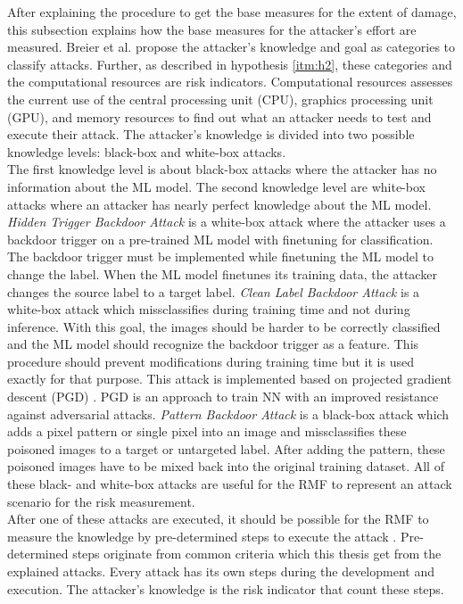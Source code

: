 After explaining the procedure to get the base measures for the extent of damage, this subsection explains how the base measures for the attacker's effort are measured. Breier et al. \cite{DBLP:journals/corr/abs-2012-04884} propose the attacker's knowledge and goal as categories to classify attacks. Further, as described in hypothesis \ref{itm:h2}, these categories and the computational resources are risk indicators. Computational resources assesses the current use of the central processing unit (CPU), graphics processing unit (GPU), and memory resources to find out what an attacker needs to test and execute their attack. The attacker's knowledge is divided into two possible knowledge levels: black-box and white-box attacks. \\
The first knowledge level is about black-box attacks where the attacker has no information about the ML model.
The second knowledge level are white-box attacks where an attacker has nearly perfect knowledge about the ML model.
\textit{Hidden Trigger Backdoor Attack} \cite{DBLP:journals/corr/abs-1910-00033} is a white-box attack where the attacker uses a backdoor trigger on a pre-trained ML model with finetuning for classification. The backdoor trigger must be implemented while finetuning the ML model to change the label. When the ML model finetunes its training data, the attacker changes the source label to a target label. \textit{Clean Label Backdoor Attack} \cite{turner2018clean} is a white-box attack which missclassifies during training time and not during inference. With this goal, the images should be harder to be correctly classified and the ML model should recognize the backdoor trigger as a feature. This procedure should prevent modifications during training time but it is used exactly for that purpose. This attack is implemented based on projected gradient descent (PGD) \cite{DBLP:journals/corr/MadryMSTV17}. PGD is an approach to train NN with an improved resistance against adversarial attacks.
\textit{Pattern Backdoor Attack} \cite{DBLP:journals/corr/abs-1708-06733} is a black-box attack which adds a pixel pattern or single pixel into an image and missclassifies these poisoned images to a target or untargeted label. After adding the pattern, these poisoned images have to be mixed back into the original training dataset. All of these black- and white-box attacks are useful for the RMF to represent an attack scenario for the risk measurement. \\
After one of these attacks are executed, it should be possible for the RMF to measure the knowledge by pre-determined steps to execute the attack \cite{bsi_2013}. Pre-determined steps originate from common criteria which this thesis get from the explained attacks. Every attack has its own steps during the development and execution. The attacker's knowledge is the risk indicator that count these steps. \\
